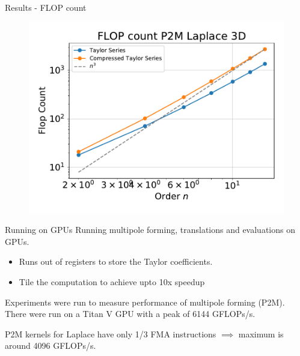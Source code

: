 \documentclass[10pt]{beamer}
\begin{document}
\begin{frame}[fragile]{Results - FLOP count}
\begin{figure}
\includegraphics[scale=0.3]{figures/flops-laplace-P2M-3d.pdf}
\end{figure}
\end{frame}

\begin{frame}[fragile]{Running on GPUs}
Running multipole forming, translations and evaluations on GPUs.
\begin{itemize}
 \item Runs out of registers to store the Taylor coefficients.
 \item Tile the computation to achieve upto 10x speedup
\end{itemize}

 Experiments were run to measure performance of multipole forming (P2M).
 There were run on a Titan V GPU with a peak of 6144 GFLOPs/s.
 
 P2M kernels for Laplace have only 1/3 FMA instructions $\implies$ maximum is around 4096 GFLOPs/s.
\end{frame}
\end{document}
